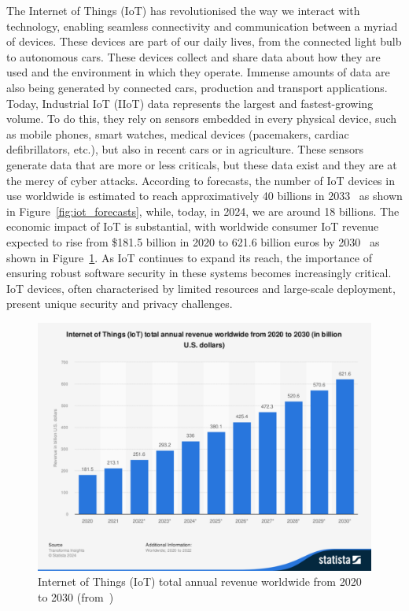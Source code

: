 The Internet of Things (IoT) has revolutionised the way we interact with technology, enabling seamless connectivity and communication between a myriad of devices. These devices are part of our daily lives, from the connected light bulb to autonomous cars. These devices collect and share data about how they are used and the environment in which they operate.  Immense amounts of data are also being generated by connected cars, production and transport applications. Today, Industrial IoT (IIoT) data represents the largest and fastest-growing volume.
To do this, they rely on sensors embedded in every physical device, such as mobile phones, smart watches, medical devices (pacemakers, cardiac defibrillators, etc.), but also in recent cars or in agriculture. These sensors generate data that are more or less criticals, but these data exist and they are at the mercy of cyber attacks.
According to forecasts, the number of IoT devices in use worldwide is estimated to reach approximatively 40 billions in 2033~\cite{statista_iot} as shown in Figure~\ref{fig:iot_forecasts}, while, today, in 2024, we are around 18 billions. The economic impact of IoT is substantial, with worldwide consumer IoT revenue expected to rise from \$181.5 billion in 2020 to 621.6 billion euros by 2030~\cite{statista_iot_revenu} as shown in Figure~\ref{fig:iot_revenue}.
As IoT continues to expand its reach, the importance of ensuring robust software security in these systems becomes increasingly critical. IoT devices, often characterised by limited resources and large-scale deployment, present unique security and privacy challenges.

\begin{figure}[ht]
    \centering
    \includegraphics[width=\linewidth, trim={1.25cm 4.75cm 1cm 3.75cm}, clip]{c1_intro/img/iot_revenue.pdf}
    \caption{Internet of Things (IoT) total annual revenue worldwide from 2020 to 2030 (from~\cite{statista_iot_revenu})}
    \label{fig:iot_revenue}
\end{figure}


